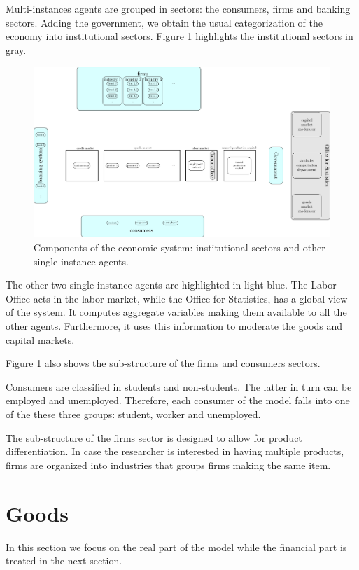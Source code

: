 \documentclass{book}
\begin{document}
Multi-instances agents are grouped in sectors: the consumers, firms and banking sectors. Adding the government, we obtain the usual categorization of the economy into institutional sectors. Figure \ref{fig:componentsc1} highlights the institutional sectors in gray.
\begin{figure}[htp]
\hskip-1cm\includegraphics[scale=0.5]{agents_and_interactions_figure1c1-0.pdf}
	\caption{Components of the economic system: institutional sectors and other single-instance agents.}
	\label{fig:componentsc1}
\end{figure}
The other two single-instance agents are highlighted in light blue. The Labor Office acts in the labor market, while the Office for Statistics, has a global view of the system. It computes aggregate variables making them available to all the other agents. Furthermore, it uses this information to moderate the goods and capital markets.

Figure \ref{fig:componentsc1} also shows the sub-structure of the firms and consumers sectors. 

Consumers are classified in students and non-students. The latter in turn can be employed and unemployed. Therefore, each consumer of the model falls into one of the these three groups: student, worker and unemployed.

The sub-structure of the firms sector is designed to allow for product differentiation. In case the researcher is interested in having multiple products, firms are organized into industries that groups firms making the same item.


\clearpage
\section{Goods}
In this section we focus on the real part of the model while the financial part is treated in the next section.
\end{document}
